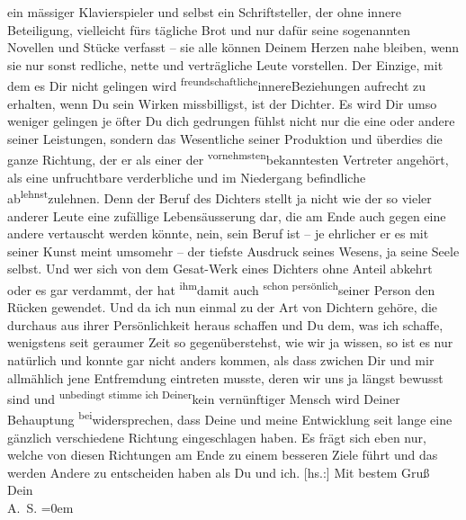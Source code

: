 \begin{ledgroupsized}[t]{13cm}
               ein mässiger Klavierspieler und selbst ein Schriftsteller, der ohne innere
               Beteiligung, vielleicht fürs tägliche Brot und nur dafür seine sogenannten Novellen
               und Stücke verfasst – sie alle können Deinem Herzen nahe bleiben, wenn sie nur sonst
               redliche, nette und verträgliche Leute vorstellen. Der Einzige, mit dem es Dir nicht
               gelingen wird \substVorne{}\textsuperscript{freundschaftliche}{\allowbreak}\substDazwischen{}innere\substHinten{}{ }{\pb}Beziehungen aufrecht zu erhalten,
               wenn Du sein Wirken missbilligst, ist der Dichter. Es wird Dir umso weniger gelingen
               je öfter Du \introOben{}dich gedrungen fühlst\introOben{} nicht nur die eine oder
               andere seiner Leistungen, sondern das Wesentliche seiner Produktion und überdies die
               ganze Richtung, der er als einer der \substVorne{}\textsuperscript{vornehmsten}{\allowbreak}\substDazwischen{}bekanntesten\substHinten{} Vertreter angehört, als eine unfruchtbare verderbliche und im Niedergang
               befindliche ab\substVorne{}\textsuperscript{lehnst}{\allowbreak}\substDazwischen{}zulehnen\substHinten{}. Denn der Beruf des Dichters stellt ja nicht wie der so vieler anderer Leute
               eine zufällige Lebensäusserung dar, die am Ende auch gegen eine andere vertauscht
               werden könnte, nein, sein Beruf ist – je ehrlicher er es mit seiner Kunst meint
               umsomehr – der tiefste Ausdruck seines Wesens, ja seine Seele selbst. Und wer sich
               von dem \introOben{}Gesa{\geminationm}t-\introOben{}Werk eines
               Dichters ohne Anteil abkehrt oder es gar verdammt, der hat \substVorne{}\textsuperscript{ihm}\substDazwischen{}damit\substHinten{} auch \substVorne{}\textsuperscript{schon persönlich}{\allowbreak}\substDazwischen{}seiner Person\substHinten{} den Rücken gewendet. Und da ich nun einmal zu der Art von Dichtern gehöre,
               die  durchaus aus ihrer Persönlichkeit heraus schaffen und Du dem, was
               ich schaffe, wenigstens seit geraumer Zeit so gegenüberstehst, wie wir ja wissen, so
               ist es nur natürlich und konnte gar nicht anders kommen, als dass zwichen Dir und mir
               allmählich {\pb}jene Entfremdung eintreten
               musste, deren wir uns ja längst bewusst sind und \substVorne{}\textsuperscript{unbedingt stimme ich Deiner}{\allowbreak}\substDazwischen{}kein vernünftiger Mensch wird Deiner\substHinten{} Behauptung \substVorne{}\textsuperscript{bei}\substDazwischen{}widersprechen\substHinten{}, dass Deine und meine Entwicklung seit lange eine gänzlich verschiedene
               Richtung eingeschlagen haben. Es frägt sich eben nur, welche von diesen Richtungen am
               Ende zu einem besseren Ziele führt und das werden Andere zu entscheiden haben als Du
               und ich.\pend
           \pstart
           {[}hs.:{]} Mit bestem Gruß {\\[\baselineskip]}Dein {\\[\baselineskip]}\spacefill\mbox{A. S.}\pend
           \leftskip=0em{}
         

\end{ledgroupsized}
